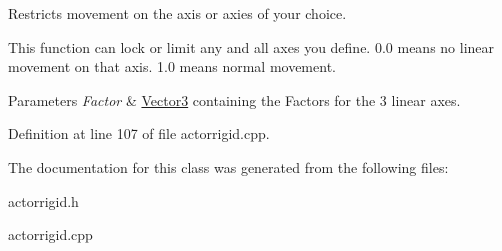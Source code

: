 Restricts movement on the axis or axies of your choice. 

This function can lock or limit any and all axes you define. 0.0 means no linear movement on that axis. 1.0 means normal movement. 
\begin{DoxyParams}{Parameters}
{\em Factor} & \hyperlink{classMezzanine_1_1Vector3}{Vector3} containing the Factors for the 3 linear axes. \\
\hline
\end{DoxyParams}


Definition at line 107 of file actorrigid.cpp.



The documentation for this class was generated from the following files:\begin{DoxyCompactItemize}
\item 
actorrigid.h\item 
actorrigid.cpp\end{DoxyCompactItemize}
